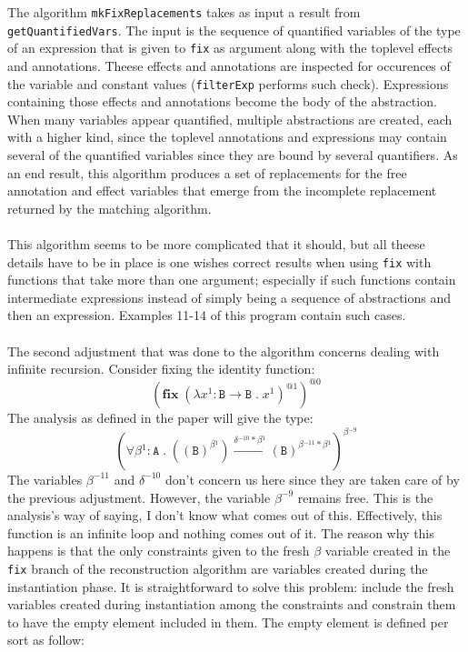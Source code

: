 \documentclass[8pt]{extarticle}
\begin{document}
The algorithm \verb+mkFixReplacements+ takes as input a result from \verb+getQuantifiedVars+. The input is the sequence of quantified variables of the type of an expression that is given to \verb+fix+ as argument along with the toplevel effects and annotations. Theese effects and annotations are inspected for occurences of the variable and constant values (\verb+filterExp+ performs such check). Expressions containing those effects and annotations become the body of the abstraction. When many variables appear quantified, multiple abstractions are created, each with a higher kind, since the toplevel annotations and expressions may contain several of the quantified variables since they are bound by several quantifiers. As an end result, this algorithm produces a set of replacements for the free annotation and effect variables that emerge from the incomplete replacement returned by the matching algorithm.
\\\\
This algorithm seems to be more complicated that it should, but all theese details have to be in place is one wishes correct results when using \verb+fix+ with functions that take more than one argument; especially if such functions contain intermediate expressions instead of simply being a sequence of abstractions and then an expression. Examples 11-14 of this program contain such cases.
\\\\
The second adjustment that was done to the algorithm concerns dealing with infinite recursion. Consider fixing the identity function:
\[
\left(\mathbf{fix}\;{}\left(\lambda{}x^{1}:\mathtt{B}\to{}\mathtt{B}\;{}.\;{}x^{1}\right)^{\mathit{@1}}\right)^{\mathit{@0}}
\]
The analysis as defined in the paper will give the type:
\[
\left(\forall{}\beta{}^{1}:\mathtt{A}\;{}.\;{}\left(\left(\mathtt{B}\right)^{\beta{}^{1}}\right)\xrightarrow{\delta{}^{-10}*\beta{}^{1}}\left(\mathtt{B}\right)^{\beta{}^{-11}*\beta{}^{1}}\right)^{\beta{}^{-9}}
\]
The variables $\beta^{-11}$ and $\delta^{-10}$ don't concern us here since they are taken care of by the previous adjustment. However, the variable $\beta^{-9}$ remains free. This is the analysis's way of saying, I don't know what comes out of this. Effectively, this function is an infinite loop and nothing comes out of it. The reason why this happens is that the only constraints given to the fresh $\beta$ variable created in the \verb+fix+ branch of the reconstruction algorithm are variables created during the instantiation phase. It is straightforward to solve this problem: include the fresh variables created during instantiation among the constraints and constrain them to have the empty element included in them. The empty element is defined per sort as follow:
\end{document}
